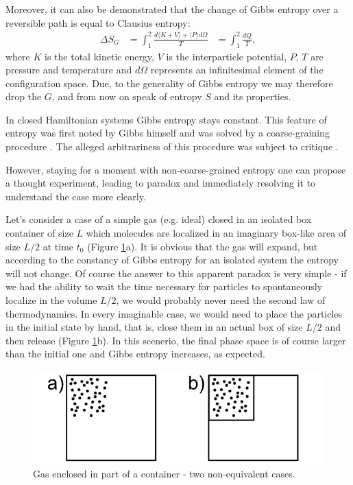 \documentclass[a4paper,12pt]{article}
\begin{document}
Moreover, it can also be demonstrated \cite{Jaynes:1965gg} that the change of Gibbs entropy over a reversible path is equal to Clausius entropy:
\begin{equation}
\begin{aligned}
  \Delta S_G &= \int_1^2 \frac{d\langle K+ V \rangle+ \langle P \rangle d\Omega}{T}
  &= \int_1^2 \frac{dQ}{T},
\end{aligned}
\end{equation}
where $K$ is the total kinetic energy, $V$ is the interparticle potential, $P$, $T$ are pressure and temperature and $d\Omega$ represents an infinitesimal element of the configuration space.
Due, to the generality of Gibbs entropy we may therefore drop the $G$, and from now on speak of entropy $S$ and its properties.

In closed Hamiltonian systems Gibbs entropy stays constant.
This feature of entropy was first noted by Gibbs himself and was solved by a coarse-graining procedure \cite{Gibbs:1928tw}. The alleged arbitrariness of this procedure was subject to critique \cite{Evans:2241458}. %

However, staying for a moment with non-coarse-grained entropy one can propose a thought experiment, leading to paradox and immediately resolving it to understand the case more clearly. 

Let's consider a case of a simple gas (e.g. ideal) closed in an isolated box container of size $L$ which molecules are localized in an imaginary box-like area of size $L/2$ at time $t_0$ (Figure \ref{Fig1}a).
It is obvious that the gas will expand, but according to the constancy of Gibbs entropy for an isolated system the entropy will not change. Of course the answer to this apparent paradox is very simple - if we had the ability to wait the time necessary for particles to spontaneously localize in the volume $L/2$, we would probably never need the second law of thermodynamics. In every imaginable case, we  would need to place the particles in the initial state by hand, that is, close them in an actual box of size $L/2$ and then release (Figure \ref{Fig1}b). 
In this scenerio, the final phase space is of course larger than the initial one and Gibbs entropy increases, as expected.

\begin{figure}[ht!]
\centering \includegraphics[width=12cm]{Figure1} \caption{Gas enclosed in part of a container - two non-equivalent cases.}
\label{Fig1} 
\end{figure}
\end{document}
